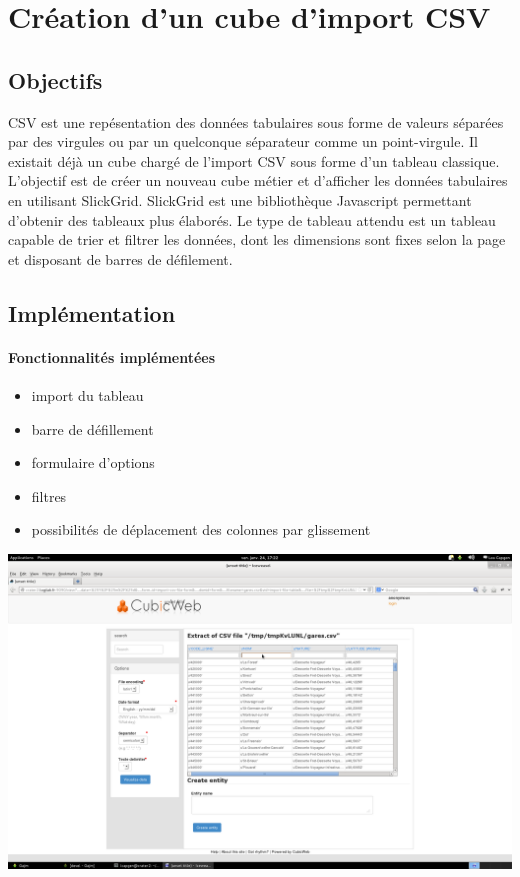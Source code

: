 \documentclass {report}
\begin{document}


\section{Création d'un cube d'import CSV}
\subsection{Objectifs}
CSV est une repésentation des données tabulaires sous forme de valeurs séparées par des virgules ou par un quelconque séparateur comme un point-virgule. Il existait déjà un cube chargé de l'import CSV sous forme d'un tableau classique. L'objectif est de créer un nouveau cube métier et d'afficher les données tabulaires en utilisant  SlickGrid. SlickGrid est une bibliothèque Javascript permettant d'obtenir des tableaux plus élaborés. Le type de tableau attendu est un tableau capable de trier et filtrer les données, dont les dimensions sont fixes selon la page et disposant de barres de défilement.
\subsection{Implémentation}

\paragraph{Fonctionnalités implémentées}
\begin{itemize}
\item import du tableau
\item barre de défillement
\item formulaire d'options
\item filtres
\item possibilités de déplacement des colonnes par glissement
\end{itemize}

\begin{center}
\includegraphics[scale=0.7]{slick.png}
\end{center}
\end{document}
